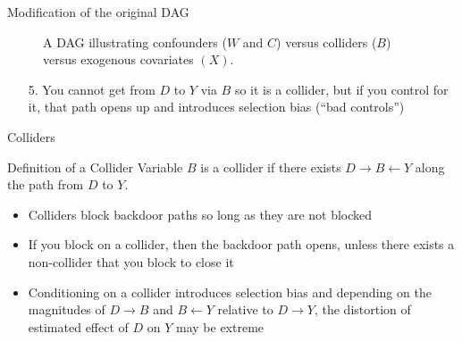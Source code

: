 \documentclass{beamer}
\begin{document}
\begin{frame}{Modification of the original DAG}

\begin{figure}
\begin{center}
\caption{A DAG illustrating confounders ($W$ and $C$) versus colliders ($B$) versus exogenous covariates $(X)$.}
\label{fig:backdoor_dag}
\end{center}
\end{figure}

\begin{enumerate}
\item[5. ] You cannot get from $D$ to $Y$ via $B$ so it is a collider, but if you control for it, that path opens up and introduces selection bias (``bad controls'')
\end{enumerate}


\end{frame}


\begin{frame}{Colliders}
	
	
	\begin{block}{Definition of a Collider}
	Variable $B$ is a collider if there exists $D \rightarrow B \leftarrow Y$ along the path from $D$ to $Y$. 
	\end{block}
	
	\begin{itemize}
	\item Colliders block backdoor paths so long as they are not blocked
	\item If you block on a collider, then the backdoor path opens, unless there exists a non-collider that you block to close it
	\item Conditioning on a collider introduces selection bias and depending on the magnitudes of $D \rightarrow B$ and $B \leftarrow Y$ relative to $D \rightarrow Y$, the distortion of estimated effect of $D$ on $Y$ may be extreme
	\end{itemize}
	
\end{frame}
\end{document}
